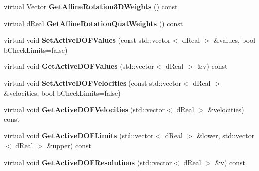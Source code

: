 \begin{DoxyCompactItemize}
\item 
\hypertarget{classOpenRAVE_1_1RobotBase_ac778428d71865bf655e99a9bd4bb8f10}{
virtual Vector {\bfseries GetAffineRotation3DWeights} () const }
\label{classOpenRAVE_1_1RobotBase_ac778428d71865bf655e99a9bd4bb8f10}

\item 
\hypertarget{classOpenRAVE_1_1RobotBase_aaa97c9f414114e097817403bebc69a65}{
virtual dReal {\bfseries GetAffineRotationQuatWeights} () const }
\label{classOpenRAVE_1_1RobotBase_aaa97c9f414114e097817403bebc69a65}

\item 
\hypertarget{classOpenRAVE_1_1RobotBase_a61b3cab18397704d70fb5ffa52f0b6b8}{
virtual void {\bfseries SetActiveDOFValues} (const std::vector$<$ dReal $>$ \&values, bool bCheckLimits=false)}
\label{classOpenRAVE_1_1RobotBase_a61b3cab18397704d70fb5ffa52f0b6b8}

\item 
\hypertarget{classOpenRAVE_1_1RobotBase_a4ff9c8d01c002b80c3a28d131b0542ba}{
virtual void {\bfseries GetActiveDOFValues} (std::vector$<$ dReal $>$ \&v) const }
\label{classOpenRAVE_1_1RobotBase_a4ff9c8d01c002b80c3a28d131b0542ba}

\item 
\hypertarget{classOpenRAVE_1_1RobotBase_a970f78a67cf4d831562471e688a10e2c}{
virtual void {\bfseries SetActiveDOFVelocities} (const std::vector$<$ dReal $>$ \&velocities, bool bCheckLimits=false)}
\label{classOpenRAVE_1_1RobotBase_a970f78a67cf4d831562471e688a10e2c}

\item 
\hypertarget{classOpenRAVE_1_1RobotBase_a15eab9433976f9b667512c8d8fab379f}{
virtual void {\bfseries GetActiveDOFVelocities} (std::vector$<$ dReal $>$ \&velocities) const }
\label{classOpenRAVE_1_1RobotBase_a15eab9433976f9b667512c8d8fab379f}

\item 
\hypertarget{classOpenRAVE_1_1RobotBase_ad1720281ce1b90117f2ea608994cd0c8}{
virtual void {\bfseries GetActiveDOFLimits} (std::vector$<$ dReal $>$ \&lower, std::vector$<$ dReal $>$ \&upper) const }
\label{classOpenRAVE_1_1RobotBase_ad1720281ce1b90117f2ea608994cd0c8}

\item 
\hypertarget{classOpenRAVE_1_1RobotBase_a79d75124b60a2e5c5896824036b83c39}{
virtual void {\bfseries GetActiveDOFResolutions} (std::vector$<$ dReal $>$ \&v) const }
\label{classOpenRAVE_1_1RobotBase_a79d75124b60a2e5c5896824036b83c39}


\end{DoxyCompactItemize}
